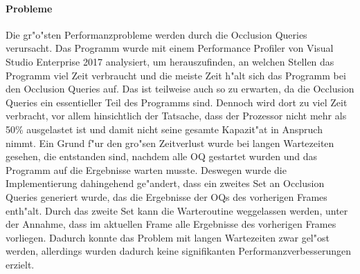 \documentclass[journal]{vgtc}
\begin{document}
\paragraph{Probleme} Die gr"o"sten Performanzprobleme werden durch die Occlusion Queries verursacht.
Das Programm wurde mit einem Performance Profiler von Visual Studio Enterprise 2017 analysiert, um herauszufinden, an welchen Stellen das Programm viel Zeit verbraucht und die meiste Zeit h"alt sich das Programm bei den Occlusion Queries auf.
Das ist teilweise auch so zu erwarten, da die Occlusion Queries ein essentieller Teil des Programms sind. Dennoch wird dort zu viel Zeit verbracht, vor allem hinsichtlich der Tatsache, dass der Prozessor nicht mehr als 50\% ausgelastet ist und damit nicht seine gesamte Kapazit"at in Anspruch nimmt.
Ein Grund f"ur den gro"sen Zeitverlust wurde bei langen Wartezeiten gesehen, die entstanden sind, nachdem alle OQ gestartet wurden und das Programm auf die Ergebnisse warten musste.
Deswegen wurde die Implementierung dahingehend ge"andert, dass ein zweites Set an Occlusion Queries generiert wurde, das die Ergebnisse der OQs des vorherigen Frames enth"alt.
Durch das zweite Set kann die Warteroutine weggelassen werden, unter der Annahme, dass im aktuellen Frame alle Ergebnisse des vorherigen Frames vorliegen.
Dadurch konnte das Problem mit langen Wartezeiten zwar gel"ost werden, allerdings wurden dadurch keine signifikanten Performanzverbesserungen erzielt.

%
%
%
%
\end{document}
